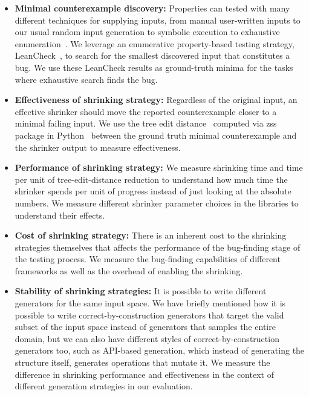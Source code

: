 \begin{itemize}
  \item \textbf{Minimal counterexample discovery:} Properties can tested with
        many different techniques for supplying inputs, from manual user-written inputs to our usual
        random input generation to symbolic execution to exhaustive enumeration~\cite{RuncimanNL08,Matela2017ToolsFD,CombinatorialEnum}.
        We leverage an enumerative property-based testing strategy, LeanCheck~\cite{Matela2017ToolsFD},
        to search for the smallest discovered input that constitutes a bug. We use these
        LeanCheck results as ground-truth minima for the tasks where exhaustive search finds the bug.
  \item \textbf{Effectiveness of shrinking strategy:} Regardless of the original input, an effective
        shrinker should move the reported counterexample closer to a minimal failing input. We use the tree edit distance~\cite{zhang1989simple}
        computed via zss package in Python~\cite{zssPythonGithub} between the ground truth minimal counterexample and
        the shrinker output to measure effectiveness.
  \item \textbf{Performance of shrinking strategy:} We measure shrinking time and time per unit of
        tree-edit-distance reduction to understand how much time the shrinker spends per unit of progress
        instead of just looking at the absolute numbers. We measure different shrinker parameter choices in
        the libraries to understand their effects.
  \item \textbf{Cost of shrinking strategy:} There is an inherent cost to the shrinking strategies themselves
        that affects the performance of the bug-finding stage of the testing process. We measure the bug-finding
        capabilities of different frameworks as well as the overhead of enabling the shrinking.
  \item \textbf{Stability of shrinking strategies:} It is possible to write different generators for the same
        input space. We have briefly mentioned how it is possible to write correct-by-construction generators that
        target the valid subset of the input space instead of generators that samples the entire domain, but we can
        also have different styles of correct-by-construction generators too, such as API-based generation,
        which instead of generating the structure itself, generates operations that mutate it. We measure
        the difference in shrinking performance and effectiveness in the context of different generation strategies
        in our evaluation.
\end{itemize}

